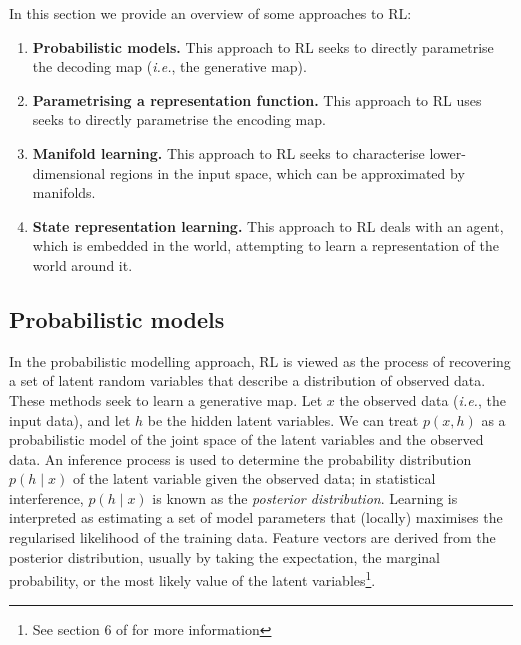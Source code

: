 In this section we provide an overview of some approaches to RL:
\begin{enumerate}
    \item \textbf{Probabilistic models.}
    This approach to RL seeks to directly parametrise the decoding map (\textit{i.e.}, the generative map).        %
    
    \item \textbf{Parametrising a representation function.}
    This approach to RL uses seeks to directly parametrise the encoding map.
    
    \item \textbf{Manifold learning.}
    This approach to RL seeks to characterise lower-dimensional regions in the input space, which can be approximated by manifolds.
    
    \item \textbf{State representation learning.}
    This approach to RL deals with an agent, which is embedded in the world, attempting to learn a representation of the world around it.
\end{enumerate}

\subsection{Probabilistic models}

In the probabilistic modelling approach, RL is viewed as the process of recovering a set of latent random variables that describe a distribution of observed data.
These methods seek to learn a generative map. 
Let $x$ the observed data (\textit{i.e.}, the input data), and let $h$ be the hidden latent variables.
We can treat $p(x, h)$ as a probabilistic model of the joint space of the latent variables and the observed data.
An inference process is used to determine the probability distribution $p(h \mid x)$ of the latent variable given the observed data; in statistical interference, $p(h \mid x)$ is known as the \textit{posterior distribution}.
Learning is interpreted as estimating a set of model parameters that (locally) maximises the regularised likelihood of the training data.
Feature vectors are derived from the posterior distribution, usually by taking the expectation, the marginal probability, or the most likely value of the latent variables\footnote{See section 6 of \autocite{Bengio2013} for more information}.


